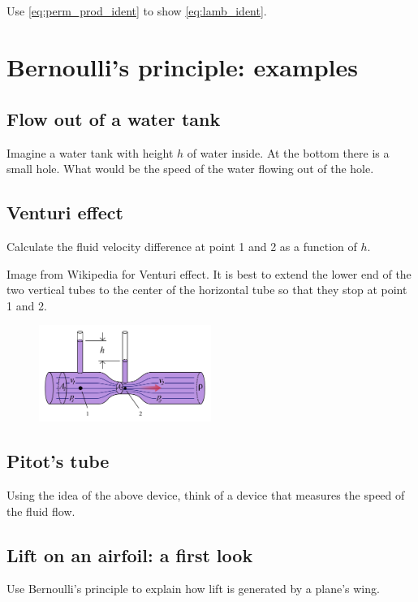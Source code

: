 \documentclass[11pt,letterpaper]{report}
\begin{document}
\subsection{}
Use \eqref{eq:perm_prod_ident} to show \eqref{eq:lamb_ident}.

\section{Bernoulli's principle: examples}
\subsection{Flow out of a water tank}
Imagine a water tank with height $h$ of water inside. At the bottom there is a small hole. What would be the speed of the water flowing out of the hole.

\subsection{Venturi effect}
Calculate the fluid velocity difference at point 1 and 2 as a function of $h$.

Image from Wikipedia for Venturi effect. It is best to extend the lower end of the two vertical tubes to the center of the horizontal tube so that they stop at point 1 and 2.
\begin{figure}[H]
    \centering
    \includegraphics[width=0.5\textwidth]{Session_4/figs/Venturi_wiki}
\end{figure}

\subsection{Pitot's tube}
Using the idea of the above device, think of a device that measures the speed of the fluid flow.

\subsection{Lift on an airfoil: a first look}
Use Bernoulli's principle to explain how lift is generated by a plane's wing.
\end{document}
